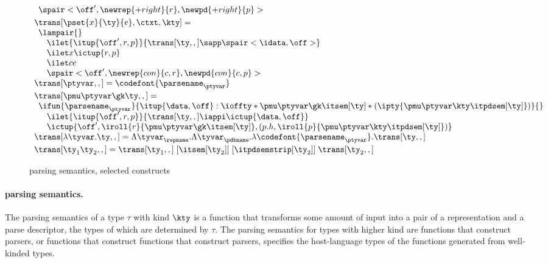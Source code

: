 \begin{figure}
\[\begin{array}{l}
\begin{array}{l}
  {  %
    \def \r {\newrep {+right}{r}}
    \def \p {\newpd {+right}{p}}
    \spair<\off',\r,\p>
  }\\ %
  \end{array}
\\[3pt]
  \trans[\pset{x}{\ty}{e},\ctxt,\kty] = \\
  \begin{array}{l}  
    \lampair{} \\
    \quad \ilet {\itup{\off',r,p}}{\trans[\ty,,] \sapp \spair<\idata,\off>} \\
    \quad \ilet x {\ictup{r,p}}\\
    \quad \ilet c e \\
    \quad \spair<\off',\newrep {con} {c,r},\newpd {con} {c,p}>
  \end{array}
\\[3pt]
\trans[\ptyvar,,] = \codefont{\parsename_\ptyvar}
\\[3pt]
\trans[\pmu \ptyvar \gk \ty,,] = \\
  \begin{array}{l}
  \ifun {\parsename_\ptyvar} {\itup{\data,\off} :
    \ioffty * \pmu \ptyvar \gk \itsem[\ty] 
                    * (\ipty{\pmu \ptyvar \kty \itpdsem[\ty]}) } {}\\
  \quad \ilet {\itup{\off',r,p}} 
   {\trans[\ty,,] \iappi \ictup{\data,\off}} \\ 
  \quad \ictup{\off',\iroll{r}{\pmu \ptyvar \gk \itsem[\ty]},
     (p.h,\iroll{p}{\pmu \ptyvar \kty \itpdsem[\ty]})}
  \end{array}  
\\[3pt]
\trans[\lambda\tyvar . \ty,,] = %
    \Lambda \tyvar_\repname. 
    \Lambda \tyvar_\pdbname. \lambda \codefont{\parsename_\ptyvar}. \trans[\ty,,]
\\[3pt]
\trans[\ty_1 \ty_2,,] = 
    \trans[\ty_1,,]\; [\itsem[\ty_2]]\; [\itpdsemstrip[\ty_2]]\; \trans[\ty_2,,]
\\
\end{array}
\]
\caption{\ddc{} parsing semantics, selected constructs}
\label{fig:ddc-sem-sum}
\end{figure}


\paragraph*{\ddc{} parsing semantics.}
\label{sec:parse-sem}
The parsing semantics of a type $\tau$ with kind $\kty$ is a function that
transforms some amount of input into a pair of a representation and a
parse descriptor, the types of which are determined by $\tau$.  The
parsing semantics for types with higher kind are functions that
construct parsers, or functions that construct functions that
construct parsers, \etc{}  specifies
the host-language types of the functions generated from well-kinded
\ddc{} types.

